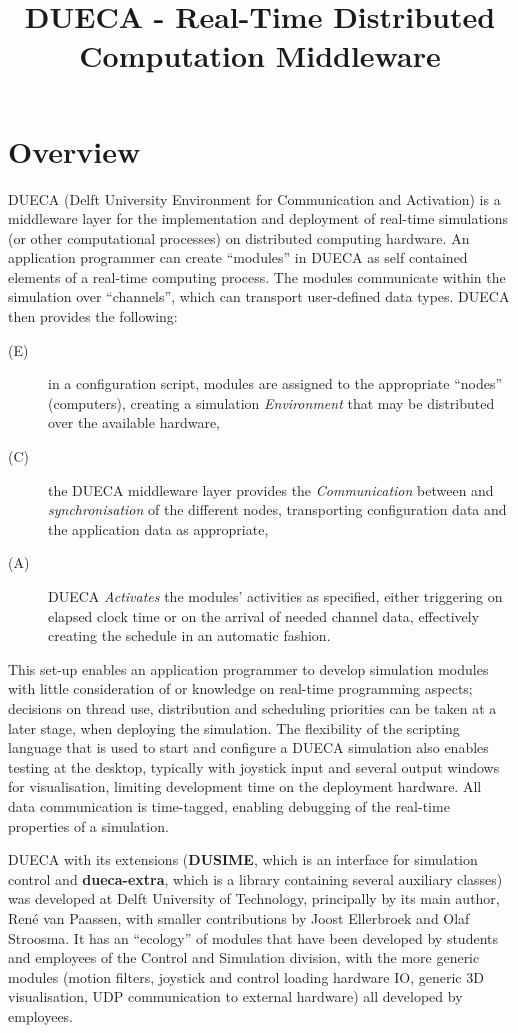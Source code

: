 \documentclass[11pt,a4paper,twoside]{scrartcl}
\title{DUECA - Real-Time Distributed Computation Middleware}
\begin{document}
\maketitle

\section{Overview}

DUECA (Delft University Environment for Communication and Activation) is a middleware layer for the implementation and deployment of real-time simulations (or other computational processes) on distributed computing hardware. An application programmer can create ``modules'' in DUECA as self contained elements of a real-time computing process. The modules communicate within the simulation over ``channels'', which can transport user-defined data types. DUECA then provides the following:

\begin{description}
\item[(E)] in a configuration script, modules are assigned to the appropriate ``nodes'' (computers), creating a simulation \emph{Environment} that may be distributed over the available hardware,
\item[(C)] the DUECA middleware layer provides the \emph{Communication} between and \emph{synchronisation} of the different nodes, transporting configuration data and the application data as appropriate,
\item[(A)] DUECA \emph{Activates} the modules' activities as specified, either triggering on elapsed clock time or on the arrival of needed channel data, effectively creating the schedule in an automatic fashion.
\end{description}

This set-up enables an application programmer to develop simulation modules with little consideration of or knowledge on real-time programming aspects; decisions on thread use, distribution and scheduling priorities can be taken at a later stage, when deploying the simulation. The flexibility of the scripting language that is used to start and configure a DUECA simulation also enables testing at the desktop, typically with joystick input and several output windows for visualisation, limiting development time on the deployment hardware. All data communication is time-tagged, enabling debugging of the real-time properties of a simulation.

DUECA with its extensions ({\bfseries DUSIME}, which is an interface for simulation control and {\bfseries dueca-extra}, which is a library containing several auxiliary classes) was developed at Delft University of Technology, principally by its main author, René van Paassen, with smaller contributions by Joost Ellerbroek and Olaf Stroosma. It has an ``ecology'' of modules that have been developed by students and employees of the Control and Simulation division, with the more generic modules (motion filters, joystick and control loading hardware IO, generic 3D visualisation, UDP communication to external hardware) all developed by employees.
\end{document}
